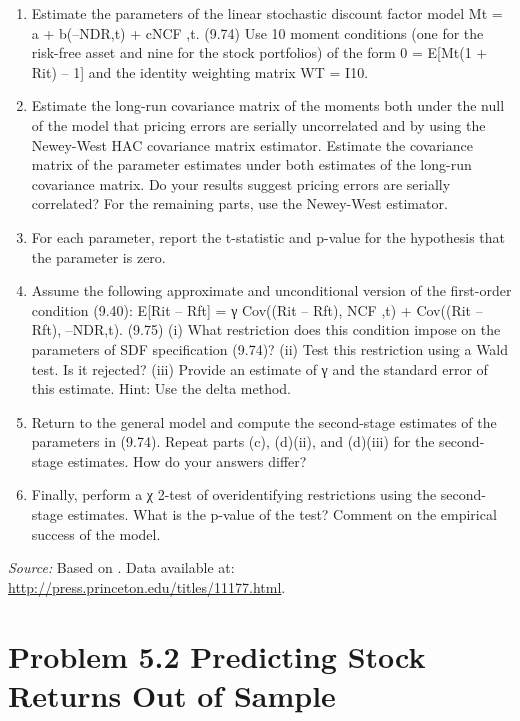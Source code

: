 \documentclass[12pt]{article}
\begin{document}
\begin{enumerate}
   \item Estimate the parameters of the linear stochastic discount factor model
Mt = a + b(–NDR,t) + cNCF ,t. (9.74)
Use 10 moment conditions (one for the risk-free asset and nine for the stock portfolios) of the form 0 = E[Mt(1 + Rit) – 1] and the identity weighting matrix WT =
I10.
\item Estimate the long-run covariance matrix of the moments both under the null of
the model that pricing errors are serially uncorrelated and by using the Newey-West
HAC covariance matrix estimator. Estimate the covariance matrix of the parameter
estimates under both estimates of the long-run covariance matrix. Do your results
suggest pricing errors are serially correlated?
For the remaining parts, use the Newey-West estimator.
\item For each parameter, report the t-statistic and p-value for the hypothesis that the
parameter is zero.
\item Assume the following approximate and unconditional version of the first-order
condition (9.40):
E[Rit – Rft] = γ Cov((Rit – Rft), NCF ,t) + Cov((Rit – Rft), –NDR,t). (9.75)
(i) What restriction does this condition impose on the parameters of SDF specification (9.74)?
(ii) Test this restriction using a Wald test. Is it rejected?
(iii) Provide an estimate of γ and the standard error of this estimate. Hint: Use the
delta method.
\item Return to the general model and compute the second-stage estimates of the
parameters in (9.74). Repeat parts (c), (d)(ii), and (d)(iii) for the second-stage
estimates. How do your answers differ?
\item Finally, perform a χ 2-test of overidentifying restrictions using the second-stage
estimates. What is the p-value of the test? Comment on the empirical success of
the model.

\end{enumerate}
\vspace{1em}
\noindent\textit{Source:} Based on \textcite{CampbellThompson2008}.  
Data available at: \url{http://press.princeton.edu/titles/11177.html}.


\newpage
\section*{Problem 5.2 Predicting Stock Returns Out of Sample}
\end{document}
